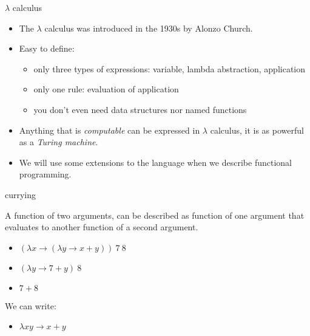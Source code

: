 \begin{frame}{$\lambda$ calculus}
  \begin{itemize}

    \pause \item The $\lambda$ calculus was introduced in the 1930s by Alonzo Church. 

    \pause \item Easy to define:
      \begin{itemize} 
         \pause \item only three types of expressions: variable, lambda abstraction, application 
         \pause \item only one rule: evaluation of application
         \pause \item you don't even need data structures nor named functions
      \end{itemize}

    \pause \item Anything that is {\em computable} can be expressed in
    $\lambda$ calculus, it is as powerful as a {\em Turing machine}.

    \pause \item We will use some extensions to the language when we describe
    functional programming.
  \end{itemize}
\end{frame}


\begin{frame}{currying}

  A function of two arguments, can be described as function of one
  argument that evaluates to another function of a second argument.

  \begin{itemize}
   \pause \item $(\lambda x \rightarrow (\lambda y \rightarrow x + y)) \ 7 \ 8$
   \pause \item $(\lambda y \rightarrow 7 + y) \ 8$
   \pause \item $7 + 8$
  \end{itemize}

 \vspace{10pt}
 We can write:
  \begin{itemize}
   \pause \item $\lambda x y \rightarrow  x + y$
  \end{itemize}

\end{frame}

